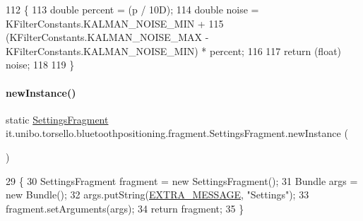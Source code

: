\begin{DoxyCode}
112                                                    \{
113         \textcolor{keywordtype}{double} percent = (p / 10D);
114         \textcolor{keywordtype}{double} noise = KFilterConstants.KALMAN\_NOISE\_MIN +
115                 (KFilterConstants.KALMAN\_NOISE\_MAX - KFilterConstants.KALMAN\_NOISE\_MIN) * percent;
116 
117         \textcolor{keywordflow}{return} (\textcolor{keywordtype}{float}) noise;
118 
119     \}
\end{DoxyCode}
\hypertarget{classit_1_1unibo_1_1torsello_1_1bluetoothpositioning_1_1fragment_1_1SettingsFragment_a4eb69c78cde2ba119eb62453688280f5_a4eb69c78cde2ba119eb62453688280f5}{}\label{classit_1_1unibo_1_1torsello_1_1bluetoothpositioning_1_1fragment_1_1SettingsFragment_a4eb69c78cde2ba119eb62453688280f5_a4eb69c78cde2ba119eb62453688280f5} 
\paragraph{\texorpdfstring{new\+Instance()}{newInstance()}}
{\footnotesize\ttfamily static \hyperlink{classit_1_1unibo_1_1torsello_1_1bluetoothpositioning_1_1fragment_1_1SettingsFragment}{Settings\+Fragment} it.\+unibo.\+torsello.\+bluetoothpositioning.\+fragment.\+Settings\+Fragment.\+new\+Instance (\begin{DoxyParamCaption}{ }\end{DoxyParamCaption})\hspace{0.3cm}{\ttfamily [static]}}


\begin{DoxyCode}
29                                                  \{
30         SettingsFragment fragment = \textcolor{keyword}{new} SettingsFragment();
31         Bundle args = \textcolor{keyword}{new} Bundle();
32         args.putString(\hyperlink{classit_1_1unibo_1_1torsello_1_1bluetoothpositioning_1_1fragment_1_1SettingsFragment_a3f3c627008cd1e176afc52642c73fd93_a3f3c627008cd1e176afc52642c73fd93}{EXTRA\_MESSAGE}, \textcolor{stringliteral}{"Settings"});
33         fragment.setArguments(args);
34         \textcolor{keywordflow}{return} fragment;
35     \}
\end{DoxyCode}
\hypertarget{classit_1_1unibo_1_1torsello_1_1bluetoothpositioning_1_1fragment_1_1SettingsFragment_a7de90efb25e655078f5f8984f7c6d628_a7de90efb25e655078f5f8984f7c6d628}{}\label{classit_1_1unibo_1_1torsello_1_1bluetoothpositioning_1_1fragment_1_1SettingsFragment_a7de90efb25e655078f5f8984f7c6d628_a7de90efb25e655078f5f8984f7c6d628} 
